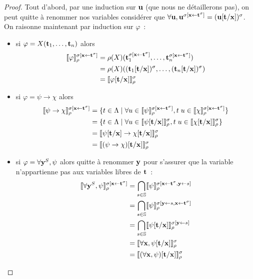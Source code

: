\documentclass{article}
\begin{document}
\begin{proof}
  Tout d'abord, par une induction sur $\mathbf{u}$ (que nous ne détaillerons pas), on peut quitte à renommer nos variables considérer que $\forall \mathbf{u}, \mathbf{u}^{\sigma[\mathbf{x}\leftarrow \mathbf{t}^\sigma]} = (\mathbf{u}[\mathbf{t}/\mathbf{x}])^\sigma$. On raisonne maintenant par induction sur $\varphi$~:
  \begin{itemize}
  \item si $\varphi = X(\mathbf{t}_1,\ldots,\mathbf{t}_n)$ alors
    \begin{align*}
      \llbracket \varphi \rrbracket_\rho^{\sigma[\mathbf{x}\leftarrow \mathbf{t}^\sigma]} &= \rho(X)(\mathbf{t}_1^{\sigma[\mathbf{x}\leftarrow \mathbf{t}^\sigma]},\ldots,\mathbf{t}_n^{\sigma[\mathbf{x}\leftarrow \mathbf{t}^\sigma]})\\
      &= \rho(X)((\mathbf{t}_1[\mathbf{t}/\mathbf{x}])^\sigma,\ldots,(\mathbf{t}_n[\mathbf{t}/\mathbf{x}])^\sigma)\\
      &= \llbracket \varphi[\mathbf{t}/\mathbf{x}] \rrbracket_\rho^\sigma
    \end{align*}
  \item si $\varphi = \psi \to \chi$ alors
    \begin{align*}
      \llbracket \psi\to\chi \rrbracket_\rho^{\sigma[\mathbf{x}\leftarrow\mathbf{t}^\sigma]} &= \{t\in\Lambda\mid \forall u\in\llbracket \psi \rrbracket_\rho^{\sigma[\mathbf{x}\leftarrow\mathbf{t}^\sigma]}, t\;u \in \llbracket \chi \rrbracket_\rho^{\sigma[\mathbf{x}\leftarrow\mathbf{t}^\sigma]}\}\\
      &= \{t\in\Lambda\mid\forall u\in \llbracket \psi[\mathbf{t}/\mathbf{x}] \rrbracket_\rho^\sigma, t\;u\in\llbracket \chi[\mathbf{t}/\mathbf{x}] \rrbracket_\rho^\sigma\}\\
      &= \llbracket \psi[\mathbf{t}/\mathbf{x}]\to\chi[\mathbf{t}/\mathbf{x}] \rrbracket_\rho^\sigma\\
      &= \llbracket (\psi\to\chi)[\mathbf{t}/\mathbf{x}] \rrbracket_\rho^\sigma
    \end{align*}
  \item si $\varphi = \forall \mathbf{y}^S, \psi$ alors quitte à renommer $\mathbf{y}$ pour s'assurer que la variable n'appartienne pas aux variables libres de $\mathbf{t}$~:
    \begin{align*}
      \llbracket \forall \mathbf{y}^S,\psi \rrbracket_\rho^{\sigma[\mathbf{x}\leftarrow\mathbf{t}^\sigma]} &= \bigcap_{s\in \mathbb{S}}\llbracket \psi \rrbracket_\rho^{\sigma[\mathbf{x}\leftarrow\mathbf{t}^\sigma,\mathbf{y}\leftarrow s]}\\
      &= \bigcap_{s\in\mathbb{S}}\llbracket \psi \rrbracket_\rho^{\sigma[\mathbf{y}\leftarrow s, \mathbf{x}\leftarrow \mathbf{t}^\sigma]}\\
      &= \bigcap_{s\in\mathbb{S}}\llbracket \psi[\mathbf{t}/\mathbf{x}] \rrbracket_\rho^{\sigma[\mathbf{y}\leftarrow s]}\\
      &= \llbracket \forall \mathbf{x}, \psi[\mathbf{t}/\mathbf{x}] \rrbracket_\rho^\sigma\\
      &= \llbracket (\forall \mathbf{x}, \psi)[\mathbf{t}/\mathbf{x}] \rrbracket_\rho^\sigma
    \end{align*}

\end{itemize}
\end{proof}
\end{document}
